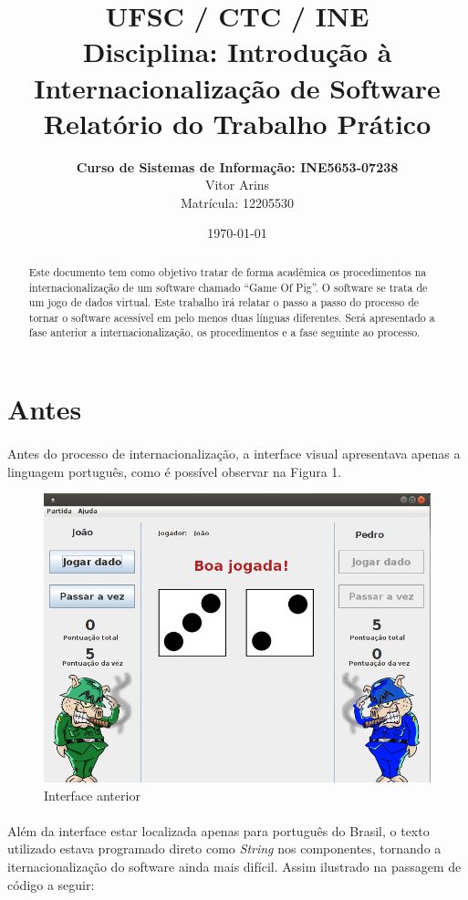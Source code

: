 \documentclass[a4paper, 12pt]{article}
\title{UFSC / CTC / INE \\
{\bf Disciplina: Introdução à Internacionalização de Software} \\
{\bf Relatório do Trabalho Prático}}
\author{ {\bf Curso de Sistemas de Informação: INE5653-07238}  \\
  Vitor Arins  \\
  Matrícula: 12205530
}
\date{\today}
\begin{document}
\maketitle

\begin{abstract}
Este documento tem como objetivo tratar de forma acadêmica os
procedimentos na internacionalização de um software chamado ``Game Of
Pig''. O software se trata de um jogo de dados virtual. Este trabalho
irá relatar o passo a passo do processo de tornar o software acessível
em pelo menos duas línguas diferentes. Será apresentado a fase
anterior a internacionalização, os procedimentos e a fase seguinte ao
processo.
\end{abstract}

\section{Antes} \label{antes}

\FloatBarrier
\paragraph{} Antes do processo de internacionalização, a interface visual
apresentava apenas a linguagem português, como é possível observar na
Figura 1.

\begin{figure}[h!]
\centering
\includegraphics[width=\textwidth]{pig-portugues.png}
\caption{Interface anterior}
\end{figure}

\FloatBarrier
\paragraph{} Além da interface estar localizada apenas para português
do Brasil, o texto utilizado estava programado direto como
\emph{String} nos componentes, tornando a iternacionalização do
software ainda mais difícil. Assim ilustrado na passagem de código a
seguir:
\end{document}
